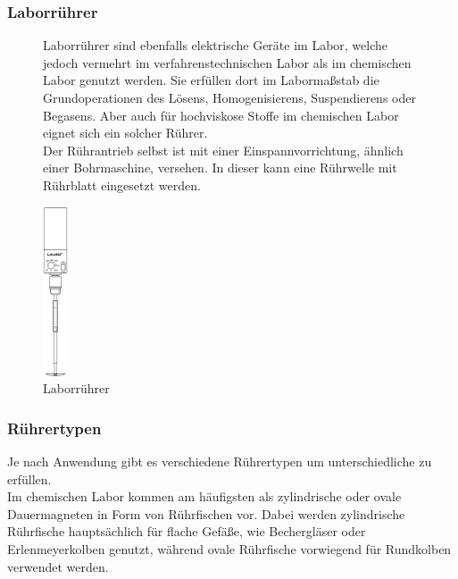 \subsubsection*{Laborrührer}
\begin{figure}[h!]
	\begin{minipage}[t]{0.65\textwidth}
		\vspace{0pt}
		Laborrührer sind ebenfalls elektrische Geräte im Labor, welche jedoch vermehrt im verfahrenstechnischen Labor als im chemischen Labor genutzt werden. Sie erfüllen dort im Labormaßstab die Grundoperationen des Lösens, Homogenisierens, Suspendierens oder Begasens. Aber auch für hochviskose Stoffe im chemischen Labor eignet sich ein solcher Rührer.\\
		Der Rührantrieb selbst ist mit einer Einspannvorrichtung, ähnlich einer Bohrmaschine, versehen. In dieser kann eine Rührwelle mit Rührblatt eingesetzt werden.
	\end{minipage}
	\hfill
	\hspace{1mm}
	\begin{minipage}[t]{0.3\textwidth}
		\vspace{0pt}
		\centering
		\includegraphics[height=5cm]{img/laborruehrer}
		\caption{Laborrührer}
		\label{fig:laborruehrer}
	\end{minipage}
\end{figure}
\FloatBarrier

\subsubsection*{Rührertypen}
Je nach Anwendung gibt es verschiedene Rührertypen um unterschiedliche zu erfüllen. \\
Im chemischen Labor kommen am häufigsten als zylindrische oder ovale Dauermagneten in Form von Rührfischen vor. Dabei werden zylindrische Rührfische hauptsächlich für flache Gefäße, wie Bechergläser oder Erlenmeyerkolben genutzt, während ovale Rührfische vorwiegend für Rundkolben verwendet werden. \\

